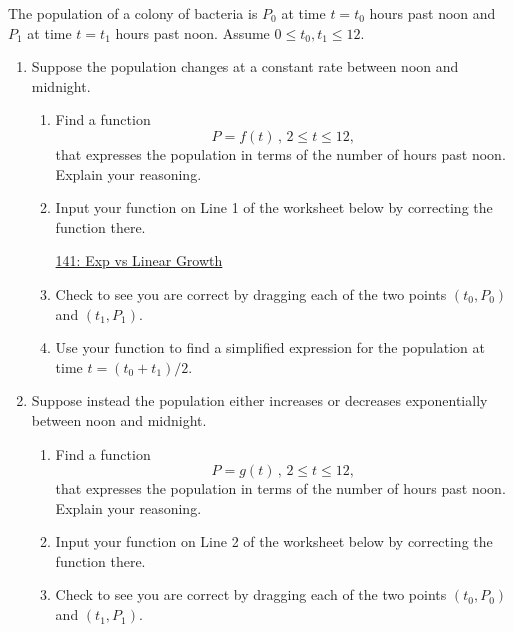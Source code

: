 \documentclass{ximera}
\begin{document}
\begin{example} \label{Ex5434232388766}
The population of a colony of bacteria is $P_0$ at time $t=t_0$ hours past noon and $P_1$ at time $t=t_1$ hours past noon.
Assume $0 \leq t_0, t_1 \leq 12$.

\begin{enumerate}

\item Suppose the population changes at a constant rate between noon and midnight.

\begin{enumerate}
\item Find a function 
\[
      P = f(t) \, , \, 2\leq t \leq 12 ,
\]
that expresses the population in terms of the number of hours past noon. Explain your reasoning.

\item Input your function on Line 1 of the worksheet below by correcting the function there.

\begin{onlineOnly}
    \begin{center}
\end{center}
\end{onlineOnly}

\href{https://www.desmos.com/calculator/vdwsk61zza}{141: Exp vs Linear Growth}

\item Check to see you are correct by dragging each of the two points $(t_0, P_0)$ and $(t_1, P_1)$.

\item Use your function to find a simplified expression for the population at time $t=(t_0+t_1)/2$.

\end{enumerate}


\item Suppose instead the population either increases or decreases exponentially between noon and midnight. 


\begin{enumerate}
\item Find a function 
\[
      P = g(t) \, , \, 2\leq t \leq 12 ,
\]
that expresses the population in terms of the number of hours past noon. Explain your reasoning.

\item Input your function on Line 2 of the worksheet below by correcting the function there.

\item Check to see you are correct by dragging each of the two points $(t_0, P_0)$ and $(t_1, P_1)$.


\end{enumerate}
\end{enumerate}
\end{example}
\end{document}
